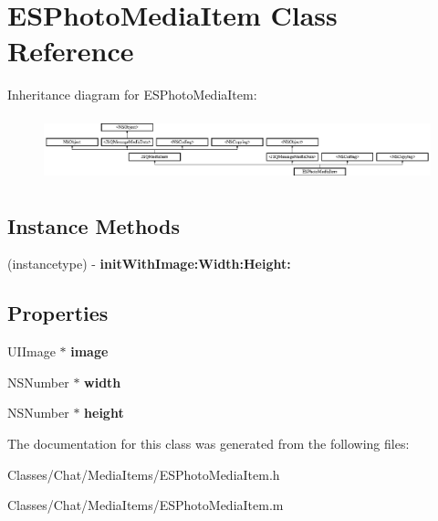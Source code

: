 \hypertarget{interface_e_s_photo_media_item}{}\section{E\+S\+Photo\+Media\+Item Class Reference}
\label{interface_e_s_photo_media_item}
Inheritance diagram for E\+S\+Photo\+Media\+Item\+:\begin{figure}[H]
\begin{center}
\leavevmode
\includegraphics[height=1.871345cm]{interface_e_s_photo_media_item}
\end{center}
\end{figure}
\subsection*{Instance Methods}
\begin{DoxyCompactItemize}
\item 
\hypertarget{interface_e_s_photo_media_item_a3fe5e6adb2a760c1edbaa8b2bdf67e6a}{}(instancetype) -\/ {\bfseries init\+With\+Image\+:\+Width\+:\+Height\+:}\label{interface_e_s_photo_media_item_a3fe5e6adb2a760c1edbaa8b2bdf67e6a}

\end{DoxyCompactItemize}
\subsection*{Properties}
\begin{DoxyCompactItemize}
\item 
\hypertarget{interface_e_s_photo_media_item_a6a1eb8080100acc82bb7a9cd85d0a829}{}U\+I\+Image $\ast$ {\bfseries image}\label{interface_e_s_photo_media_item_a6a1eb8080100acc82bb7a9cd85d0a829}

\item 
\hypertarget{interface_e_s_photo_media_item_a16da40d9c5db77625aa81a9942bd9858}{}N\+S\+Number $\ast$ {\bfseries width}\label{interface_e_s_photo_media_item_a16da40d9c5db77625aa81a9942bd9858}

\item 
\hypertarget{interface_e_s_photo_media_item_a4d09a724a340fd86810fe155640d89d7}{}N\+S\+Number $\ast$ {\bfseries height}\label{interface_e_s_photo_media_item_a4d09a724a340fd86810fe155640d89d7}

\end{DoxyCompactItemize}


The documentation for this class was generated from the following files\+:\begin{DoxyCompactItemize}
\item 
Classes/\+Chat/\+Media\+Items/E\+S\+Photo\+Media\+Item.\+h\item 
Classes/\+Chat/\+Media\+Items/E\+S\+Photo\+Media\+Item.\+m\end{DoxyCompactItemize}
